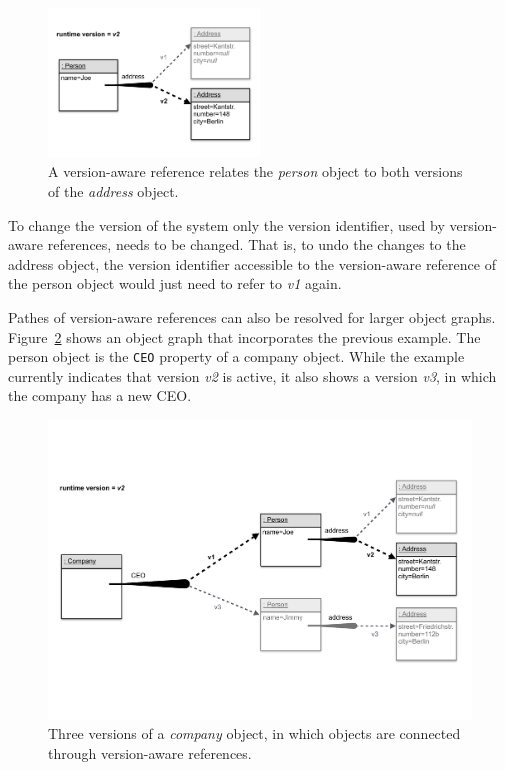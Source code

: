 \begin{figure}[h]
    \centering
    \includegraphics[width=0.5\textwidth]{figures/4_approach/6_versionAwareReferenceFollowingVersion2.pdf}
    \caption{A version-aware reference relates the \emph{person} object to both versions of the \emph{address} object.}
    \label{fig:VersionAwareReferenceFollowingVersion2}
\end{figure}

To change the version of the system only the version identifier, used by version-aware references, needs to be changed.
That is, to undo the changes to the address object, the version identifier accessible to the version-aware reference of the person object would just need to refer to \emph{v1} again.

Pathes of version-aware references can also be resolved for larger object graphs.
Figure~\ref{fig:ObjectGraphWithWithReferencesResolvedAlongVersion2} shows an object graph that incorporates the previous example.
The person object is the \lstinline{CEO} property of a company object.
While the example currently indicates that version \emph{v2} is active, it also shows a version \emph{v3}, in which the company has a new CEO.

\begin{figure}[h]
    \centering
    \includegraphics[width=\textwidth]{figures/4_approach/7_objectGraphWithVARefs.pdf}
    \caption{Three versions of a \emph{company} object, in which objects are connected through version-aware references.}
    \label{fig:ObjectGraphWithWithReferencesResolvedAlongVersion2}
\end{figure}

